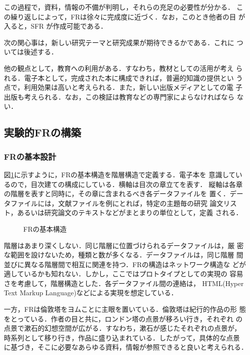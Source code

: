 この過程で，資料，情報の不備が判明し，それらの充足の必要性が分かる．
この繰り返しによって，FRは徐々に完成度に近づく．なお，このとき他者の目
が入ると，SFR が作成可能である．

次の関心事は，新しい研究テーマと研究成果が期待できるかである．これに
ついては後述する．

他の観点として，教育への利用がある．すなわち，教材としての活用が考え
られる．電子本として，完成された本に構成できれば，普遍的知識の提供とい
う点で，利用効果は高いと考えられる．また，新しい出版メディアとしての電
子出版も考えられる．なお，この検証は教育などの専門家によらなければなら
ない．

\subsection{実験的FRの構築}



\subsubsection{FRの基本設計}
図\ref{fig:5}に示すように，FRの基本構造を階層構造で定義する．電子本を
意識しているので，目次建ての構成にしている．横軸は目次の章立てを表す．
縦軸は各章の階層を表すと同時に，その章に含まれるべき各データファイルを
置く．データファイルには，文献ファイルを例にとれば，特定の主題毎の研究
論文リスト，あるいは研究論文のテキストなどがまとまりの単位として，定義
される．

\begin{figure}[htbp]
\begin{center}
  
  \caption{FRの基本構造}\label{fig:5}
\end{center}
\end{figure}

階層はあまり深くしない．同じ階層に位置づけられるデータファイルは，厳
密な範囲を設けないため，種類と数が多くなる．データファイルは，同じ階層
間並びに異なる階層間で相互に関連を持つ．FRの構造はネットワーク構造な
どが適しているかも知れない．しかし，ここではプロトタイプとしての実現の
容易さを考慮して，階層構造とした．各データファイル間の連絡は，
HTML(Hyper Text Markup Language)などによる実現を想定している．

一方，FRは倫敦塔をヨムことに主眼を置いている．倫敦塔は紀行的作品の形
態をとっている．作者の目と共に，ロンドン塔の点景が移ろい行き，それぞれ
の点景で漱石的幻想空間が広がる．すなわち，漱石が感じたそれぞれの点景が，
時系列として移り行き，作品に盛り込まれている．したがって，具体的な点景
に基づき，そこに必要なあらゆる資料，情報が参照できると良いと考えられる．

